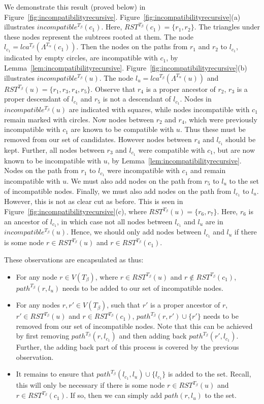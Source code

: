 \documentclass{article}
\newcommand{\leafset}{\Lambda}
\newcommand{\TA}{T_\alpha}
\newcommand{\TB}{T_\beta}
\begin{document}
    We demonstrate this result (proved below) in Figure~\ref{fig:incompatibilityrecursive}. Figure~\ref{fig:incompatibilityrecursive}(a) illustrates $incompatible^{\TB}(c_1)$. Here, $RST^{\TB}(c_1) = \{r_1, r_2\}$. The triangles under these nodes represent the subtrees rooted at them. The node $l_{c_1} = lca^{\TB}(\leafset^{\TA}(c_1))$. Then the nodes on the paths from $r_1$ and $r_2$ to $l_{c_1}$, indicated by empty circles, are incompatible with $c_1$, by Lemma~\ref{lem:incompatibilityrecursive}. Figure~\ref{fig:incompatibilityrecursive}(b) illustrates $incompatible^{\TB}(u)$. The node $l_u = lca^{\TB}(\leafset^{\TA}(u))$ and $RST^{\TB}(u) = \{r_1, r_3, r_4, r_5\}$. Observe that $r_4$ is a proper ancestor of $r_2$, $r_3$ is a proper descendant of $l_{c_1}$ and $r_5$ is not a descendant of $l_{c_1}$. Nodes in $incompatible^{\TB}(u)$ are indicated with squares, while nodes incompatible with $c_1$ remain marked with circles. Now nodes between $r_2$ and $r_4$, which were previously incompatible with $c_1$ are known to be compatible with $u$. Thus these must be removed from our set of candidates. However nodes between $r_4$ and $l_{c_1}$ should be kept. Further, all nodes between $r_3$ and $l_{c_1}$ were compatible with $c_1$, but are now known to be incompatible with $u$, by Lemma~\ref{lem:incompatibilityrecursive}. Nodes on the path from $r_1$ to $l_{c_1}$ were incompatible with $c_1$ and remain incompatible with $u$. We must also add nodes on the path from $r_5$ to $l_u$ to the set of incompatible nodes. Finally, we must also add nodes on the path from $l_{c_1}$ to $l_u$. However, this is not as clear cut as before. This is seen in Figure~\ref{fig:incompatibilityrecursive}(c), where $RST^{\TB}(u) = \{r_6, r_7\}$. Here, $r_6$ is an ancestor of $l_{c_1}$, in which case not all nodes between $l_{c_1}$ and $l_u$ are in $incompatible^{\TB}(u)$. Hence, we should only add nodes between $l_{c_1}$ and $l_u$ if there is some node $r \in RST^{\TB}(u)$ and $r \in RST^{\TB}(c_1)$.

    These observations are encapsulated as thus:
    \begin{itemize}
        \item For any node $r \in V(\TB)$, where $r \in RST^{\TB}(u)$ and $r \not\in RST^{\TB}(c_1)$, $path^{\TB}(r, l_u)$ needs to be added to our set of incompatible nodes.

        \item For any nodes $r, r' \in V(\TB)$, such that $r'$ is a proper ancestor of $r$, $r' \in RST^{\TB}(u)$ and $r \in RST^{\TB}(c_1)$, $path^{\TB}(r, r') \cup \{r'\}$ needs to be removed from our set of incompatible nodes. Note that this can be achieved by first removing $path^{\TB}(r, l_{c_1})$ and then adding back $path^{\TB}(r', l_{c_1})$. Further, the adding back part of this process is covered by the previous observation.

        \item It remains to ensure that $path^{\TB}(l_{c_1}, l_u) \cup \{l_{c_1}\}$ is added to the set. Recall, this will only be necessary if there is some node $r \in RST^{\TB}(u)$ and $r \in RST^{\TB}(c_1)$. If so, then we can simply add $path(r, l_u)$ to the set.
    \end{itemize}
\end{document}

